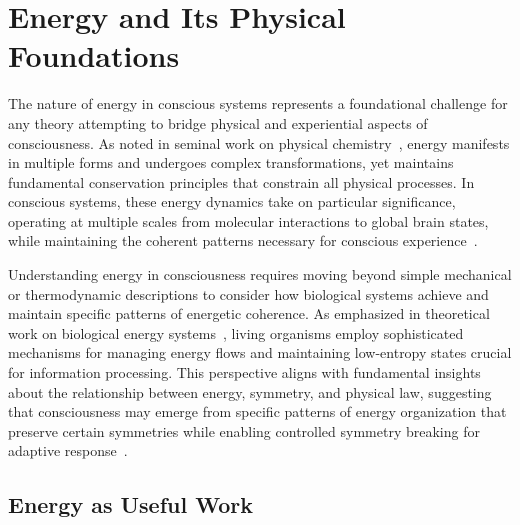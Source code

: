 \section{Energy and Its Physical Foundations~}

The nature of energy in conscious systems represents a foundational challenge for any theory attempting to bridge physical and experiential aspects of consciousness. As noted in seminal work on physical chemistry~\cite{attwell2001}, energy manifests in multiple forms and undergoes complex transformations, yet maintains fundamental conservation principles that constrain all physical processes. In conscious systems, these energy dynamics take on particular significance, operating at multiple scales from molecular interactions to global brain states, while maintaining the coherent patterns necessary for conscious experience~\cite{demetrius2015}.

Understanding energy in consciousness requires moving beyond simple mechanical or thermodynamic descriptions to consider how biological systems achieve and maintain specific patterns of energetic coherence. As emphasized in theoretical work on biological energy systems~\cite{laughlin2001}, living organisms employ sophisticated mechanisms for managing energy flows and maintaining low-entropy states crucial for information processing. This perspective aligns with fundamental insights about the relationship between energy, symmetry, and physical law, suggesting that consciousness may emerge from specific patterns of energy organization that preserve certain symmetries while enabling controlled symmetry breaking for adaptive response~\cite{parrondo2015}.

\subsection*{Energy as Useful Work~}

